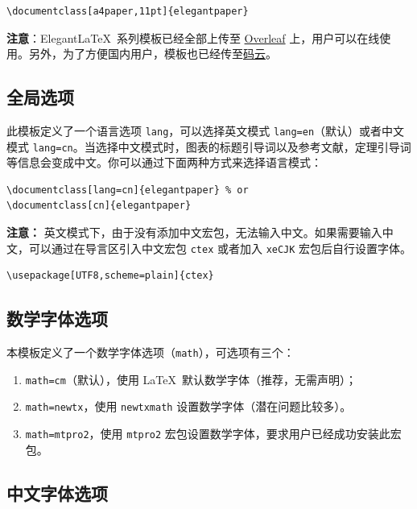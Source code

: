 \documentclass[lang=cn,a4paper,newtx]{elegantpaper}
\begin{document}
\begin{lstlisting}
\documentclass[a4paper,11pt]{elegantpaper}
\end{lstlisting}

\textbf{注意}：Elegant\LaTeX\ 系列模板已经全部上传至 \href{https://www.overleaf.com/latex/templates/elegantpaper-template/yzghrqjhmmmr}{Overleaf} 上，用户可以在线使用。另外，为了方便国内用户，模板也已经传至\href{https://gitee.com/ElegantLaTeX/ElegantPaper}{码云}。


\subsection{全局选项}
此模板定义了一个语言选项 \lstinline{lang}，可以选择英文模式 \lstinline{lang=en}（默认）或者中文模式 \lstinline{lang=cn}。当选择中文模式时，图表的标题引导词以及参考文献，定理引导词等信息会变成中文。你可以通过下面两种方式来选择语言模式：
\begin{lstlisting}
\documentclass[lang=cn]{elegantpaper} % or
\documentclass[cn]{elegantpaper} 
\end{lstlisting}

\textbf{注意：} 英文模式下，由于没有添加中文宏包，无法输入中文。如果需要输入中文，可以通过在导言区引入中文宏包 \lstinline{ctex} 或者加入 \lstinline{xeCJK} 宏包后自行设置字体。 
\begin{lstlisting}
\usepackage[UTF8,scheme=plain]{ctex}
\end{lstlisting}

\subsection{数学字体选项}

本模板定义了一个数学字体选项（\lstinline{math}），可选项有三个：
\begin{enumerate}
  \item \lstinline{math=cm}（默认），使用 \LaTeX\ 默认数学字体（推荐，无需声明）；
  \item \lstinline{math=newtx}，使用 \lstinline{newtxmath} 设置数学字体（潜在问题比较多）。
  \item \lstinline{math=mtpro2}，使用 \lstinline{mtpro2} 宏包设置数学字体，要求用户已经成功安装此宏包。
\end{enumerate}

\subsection{中文字体选项}
\end{document}
